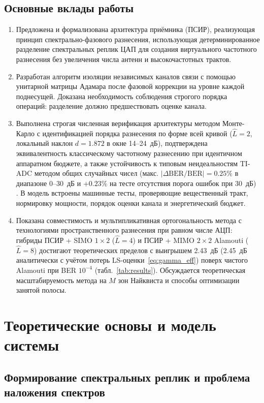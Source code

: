 \documentclass[a4paper,12pt]{article}
\numberwithin{equation}{section}
\newcommand{\BER}{\mathrm{BER}}
\begin{document}
\subsection{Основные вклады работы}
\begin{enumerate}
    \item Предложена и формализована архитектура приёмника (ПСИР), реализующая принцип спектрально-фазового разнесения, использующая детерминированное разделение спектральных реплик ЦАП для создания виртуального частотного разнесения без увеличения числа антенн и высокочастотных трактов.
    \item Разработан алгоритм изоляции независимых каналов связи с помощью унитарной матрицы Адамара после фазовой коррекции на уровне каждой поднесущей. Доказана необходимость соблюдения строгого порядка операций: разделение должно предшествовать оценке канала.
    \item Выполнена строгая численная верификация архитектуры методом Монте-Карло с идентификацией порядка разнесения по форме всей кривой ($\hat{L}=2$, локальный наклон $d = 1.872$ в окне 14--24~дБ), подтверждена эквивалентность классическому частотному разнесению при идентичном аппаратном бюджете, а также устойчивость к типовым неидеальностям TI-ADC методом общих случайных чисел (макс. $|\Delta\BER/\BER| = 0.25\%$ в диапазоне 0--30~дБ и $+0.23\%$ на тесте отсутствия порога ошибок при 30~дБ) \cite{ieee_std,adi_mt008}. В модель встроены машинные тесты, проверяющие вещественный тракт, нормировку мощности, порядок оценки канала и энергетический бюджет.     \item Показана совместимость и мультипликативная ортогональность метода с технологиями пространственного разнесения при равном числе АЦП: гибриды ПСИР + SIMO $1{\times}2$ ($\hat{L}=4$) и ПСИР + MIMO $2{\times}2$ Alamouti ($\hat{L}=8$) достигают теоретических пределов \cite{proakis} с выигрышем 2.43~дБ (2.45~дБ аналитически с учётом потерь LS-оценки~\eqref{eq:gamma_eff}) поверх чистого Alamouti при BER $10^{-4}$ (табл.~\ref{tab:results}). Обсуждается теоретическая масштабируемость метода на $M$ зон Найквиста и способы оптимизации занятой полосы.
\end{enumerate}

\section{Теоретические основы и модель системы}

\subsection{Формирование спектральных реплик и проблема наложения спектров}
\end{document}
